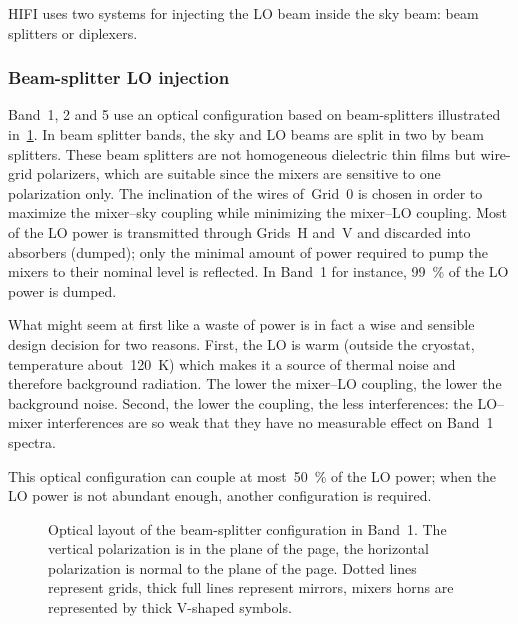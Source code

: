 HIFI uses two systems for injecting the LO beam inside the sky beam: beam splitters or diplexers.

\subsubsection{Beam-splitter LO injection}
Band~1, 2 and 5 use an optical configuration based on beam-splitters illustrated in~\cref{fig:beamsplitter_layout}.
In beam splitter bands, the sky and LO beams are split in two by beam splitters.
These beam splitters are not homogeneous dielectric thin films but wire-grid polarizers, which are suitable since the mixers are sensitive to one polarization only.
The inclination of the wires of~Grid~0 is chosen in order to maximize the mixer--sky coupling while minimizing the mixer--LO coupling.
Most of the LO power is transmitted through Grids~H and~V and discarded into absorbers (dumped);
only the minimal amount of power required to pump the mixers to their nominal level is reflected.
In Band~1 for instance, \SI{99}{\percent} of the LO power is dumped.

What might seem at first like a waste of power is in fact a wise and sensible design decision for two reasons.
First, the LO is warm (outside the cryostat, temperature about~\SI{120}{\kelvin}) which makes it a source of thermal noise and therefore background radiation.
The lower the mixer--LO coupling, the lower the background noise.
Second, the lower the coupling, the less interferences: the LO--mixer interferences are so weak that they have no measurable effect on Band~1 spectra.

This optical configuration can couple at most~\SI{50}{\percent} of the LO power;
when the LO power is not abundant enough, another configuration is required.

\begin{figure}
    \centering
    \footnotesize
    
    \caption{Optical layout of the beam-splitter configuration in Band~1.
    The vertical polarization is in the plane of the page, the horizontal polarization is normal to the plane of the page.
    Dotted lines represent grids, thick full lines represent mirrors, mixers horns are represented by thick V-shaped symbols.
    }
    \label{fig:beamsplitter_layout}
\end{figure}

